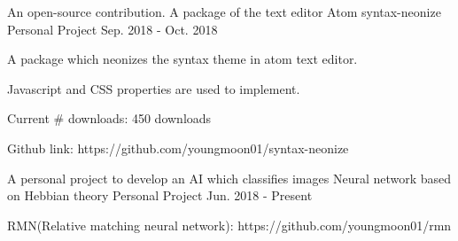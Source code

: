 


\begin{cventries}


\cventry
{An open-source contribution. A package of the text editor Atom} %
{syntax-neonize} %
{Personal Project} %
{Sep. 2018 - Oct. 2018} %
{ %
\begin{cvitems}
\item {A package which neonizes the syntax theme in atom text editor.}
\item {Javascript and CSS properties are used to implement.}
\item {Current \# downloads: 450 downloads}
\item {Github link: https://github.com/youngmoon01/syntax-neonize}
\end{cvitems}
}


\cventry
{A personal project to develop an AI which classifies images} %
{Neural network based on Hebbian theory} %
{Personal Project} %
{Jun. 2018 - Present} %
{ %
\begin{cvitems}
\item {RMN(Relative matching neural network): https://github.com/youngmoon01/rmn}
\end{cvitems}
}


\end{cventries}
